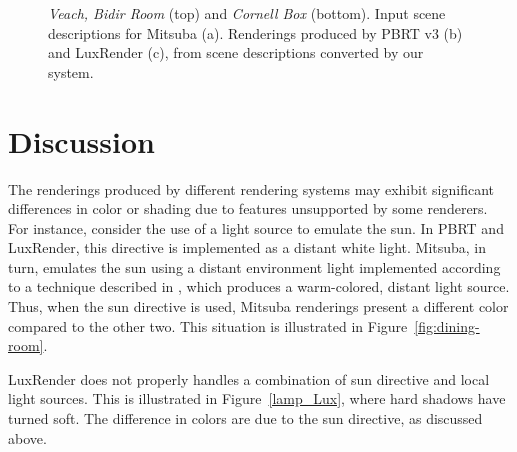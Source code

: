\begin{figure}[h]
  \caption{\textit{Veach, Bidir Room} (top) and \textit{Cornell Box} (bottom). Input scene descriptions for Mitsuba (a). Renderings produced by PBRT v3 (b) and LuxRender (c), from scene descriptions converted by our system.}
  \label{fig:bidir-cornell}
\end{figure}

\section{Discussion}

The renderings produced by different rendering systems may exhibit significant differences in color or shading due to features unsupported by some renderers.  For instance, consider the use of a light source to emulate the sun. In PBRT and LuxRender, this directive is implemented as a distant white light. Mitsuba, in turn, emulates the sun using a distant environment light implemented according to a technique described in \cite{Preetham}, which produces a warm-colored, distant light source. Thus, when the sun directive is used, Mitsuba renderings present a different color compared to the other two. This situation is illustrated in Figure~\ref{fig:dining-room}.

LuxRender does not properly handles a combination of sun directive and local light sources. This is illustrated in Figure~\ref{lamp_Lux}, where hard shadows have turned soft. The difference in colors are due to the sun directive, as discussed above.

